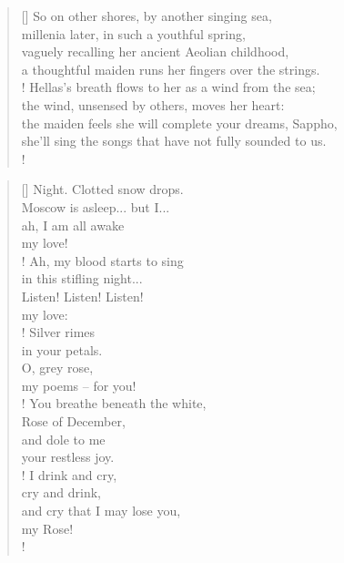 \documentclass[]{article}
\begin{document}
\settowidth{\versewidth}{millenia later, in just such a youthful spring, }
\begin{verse}[\versewidth]
So on other shores, by another singing sea,\\
millenia later, in such a youthful spring,\\
vaguely recalling her ancient Aeolian childhood,\\
a thoughtful maiden runs her fingers over the strings.\\!
Hellas's breath flows to her as a wind from the sea;\\
the wind, unsensed by others, moves her heart:\\
the maiden feels she will complete your dreams, Sappho,\\
she'll sing the songs that have not fully sounded to us.\\!
\end{verse}
\newpage 

\vspace*{0.1\textheight}
\settowidth{\versewidth}{ah, my blood starts to sing}
\begin{verse}[\versewidth]
Night. Clotted snow drops.\\
Moscow is asleep... but I...\\
ah, I am all awake\\
my love!\\!
Ah, my blood starts to sing\\
in this stifling night...\\
Listen! Listen! Listen!\\
my love:\\!
Silver rimes\\
in your petals.\\
O, grey rose,\\
my poems -- for you!\\!
You breathe beneath the white,\\
Rose of December,\\
and dole to me\\
your restless joy.\\!
I drink and cry,\\
cry and drink,\\
and cry that I may lose you,\\
my Rose!\\!
\end{verse}
\newpage
\end{document}
